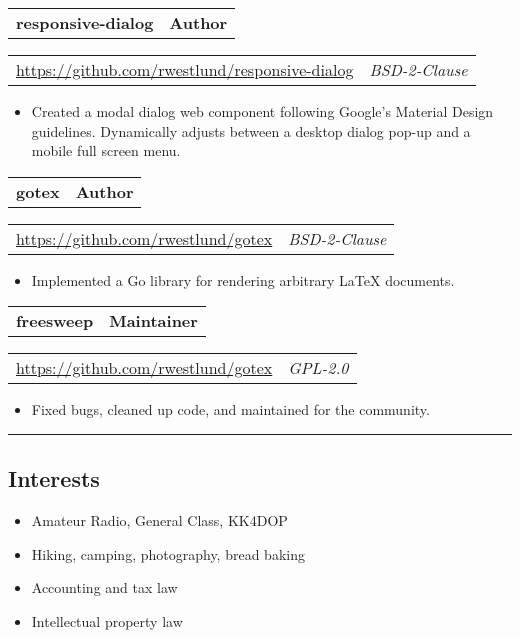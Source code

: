 \documentclass[10pt,letterpaper]{article}
\newcommand{\headerrow}[2]{%
    \begin{tabularx}{\linewidth}{Xr}
	    #1 & #2 \\
    \end{tabularx}
}
\begin{document}
    \headerrow{\textbf{responsive-dialog}}{\textbf{Author}}
    \headerrow{\url{https://github.com/rwestlund/responsive-dialog}}{\textit{BSD-2-Clause}}
    \begin{itemize}[label=--]
        \item Created a modal dialog web component following Google's Material
            Design guidelines.  Dynamically adjusts between a desktop dialog
            pop-up and a mobile full screen menu.
    \end{itemize}

    \headerrow{\textbf{gotex}}{\textbf{Author}}
    \headerrow{\url{https://github.com/rwestlund/gotex}}{\textit{BSD-2-Clause}}
    \begin{itemize}[label=--]
        \item Implemented a Go library for rendering arbitrary LaTeX documents.
    \end{itemize}

    \headerrow{\textbf{freesweep}}{\textbf{Maintainer}}
    \headerrow{\url{https://github.com/rwestlund/gotex}}{\textit{GPL-2.0}}
    \begin{itemize}[label=--]
        \item Fixed bugs, cleaned up code, and maintained for the community.
    \end{itemize}

\hrule
\vspace{-0.4em}
\subsection*{Interests}
\begin{itemize}
    \item Amateur Radio, General Class, KK4DOP
    \item Hiking, camping, photography, bread baking
    \item Accounting and tax law
    \item Intellectual property law
\end{itemize}
\end{document}
